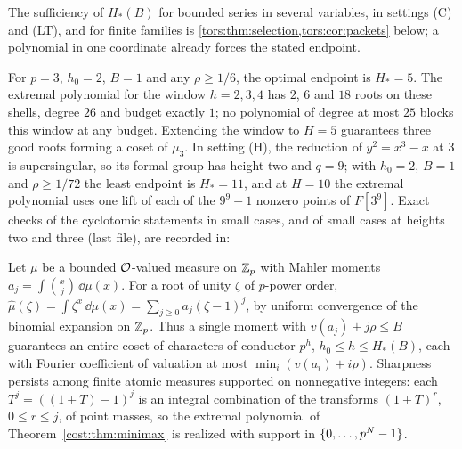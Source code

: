 The sufficiency of $H_*(B)$ for bounded series in several variables, in settings
\textup{(C)} and \textup{(LT)}, and for finite families is
\cref{tors:thm:selection,tors:cor:packets} below; a polynomial in one coordinate already
forces the stated endpoint.

\begin{example}\label{cost:ex:minimax}
For $p=3$, $h_0=2$, $B=1$ and any $\rho\ge1/6$, the optimal endpoint is $H_*=5$. The extremal polynomial for the window $h=2,3,4$ has
$2$, $6$ and $18$ roots on these shells, degree $26$ and budget exactly $1$; no polynomial
of degree at most $25$ blocks this window at any budget. Extending the window to $H=5$
guarantees three good roots forming a coset of $\mu_3$. In setting (H), the reduction of
$y^2=x^3-x$ at $3$ is supersingular, so its formal group has height two and $q=9$; with
$h_0=2$, $B=1$ and $\rho\ge1/72$ the least endpoint is $H_*=11$, and at $H=10$ the extremal
polynomial uses one lift of each of the $9^9-1$ nonzero points of $F[3^9]$. Exact checks of
the cyclotomic statements in small cases, and of small cases at heights two and three (last
file), are recorded in:
\end{example}

\begin{remark}\label{cost:rem:measures}
Let $\mu$ be a bounded $\mathcal{O}$-valued measure on $\mathbb{Z}_p$ with Mahler moments
$a_j=\int\binom xj\,\dd\mu(x)$. For a root of unity $\zeta$ of $p$-power order,
$\widehat\mu(\zeta)=\int\zeta^x\,\dd\mu(x)=\sum_{j\ge0}a_j(\zeta-1)^j$, by uniform convergence
of the binomial expansion on $\mathbb{Z}_p$. Thus a single moment with $v(a_j)+j\rho\le B$ guarantees
an entire coset of characters of conductor $p^h$, $h_0\le h\le H_*(B)$, each with Fourier
coefficient of valuation at most $\min_i(v(a_i)+i\rho)$. Sharpness persists among finite
atomic measures supported on nonnegative integers: each $T^j=((1+T)-1)^j$ is an integral
combination of the transforms $(1+T)^r$, $0\le r\le j$, of point masses, so the extremal
polynomial of Theorem~\ref{cost:thm:minimax} is realized with support in $\{0,\ldots,p^N-1\}$.
\end{remark}

